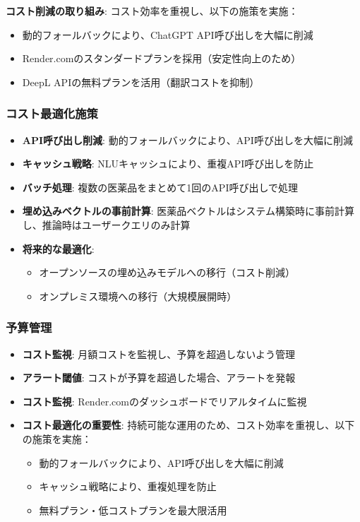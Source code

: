 \documentclass[a4paper,11pt,ja=standard,xelatex]{bxjsarticle}
\theoremstyle{definition}
\begin{document}
\textbf{コスト削減の取り組み}: コスト効率を重視し、以下の施策を実施：
\begin{itemize}
\item 動的フォールバックにより、ChatGPT API呼び出しを大幅に削減
\item Render.comのスタンダードプランを採用（安定性向上のため）
\item DeepL APIの無料プランを活用（翻訳コストを抑制）
\end{itemize}

\subsubsection{コスト最適化施策}

\begin{itemize}
\item \textbf{API呼び出し削減}: 動的フォールバックにより、API呼び出しを大幅に削減
\item \textbf{キャッシュ戦略}: NLUキャッシュにより、重複API呼び出しを防止
\item \textbf{バッチ処理}: 複数の医薬品をまとめて1回のAPI呼び出しで処理
\item \textbf{埋め込みベクトルの事前計算}: 医薬品ベクトルはシステム構築時に事前計算し、推論時はユーザークエリのみ計算
\item \textbf{将来的な最適化}: 
  \begin{itemize}
  \item オープンソースの埋め込みモデルへの移行（コスト削減）
  \item オンプレミス環境への移行（大規模展開時）
  \end{itemize}
\end{itemize}

\subsubsection{予算管理}

\begin{itemize}
\item \textbf{コスト監視}: 月額コストを監視し、予算を超過しないよう管理
\item \textbf{アラート閾値}: コストが予算を超過した場合、アラートを発報
\item \textbf{コスト監視}: Render.comのダッシュボードでリアルタイムに監視
\item \textbf{コスト最適化の重要性}: 持続可能な運用のため、コスト効率を重視し、以下の施策を実施：
  \begin{itemize}
  \item 動的フォールバックにより、API呼び出しを大幅に削減
  \item キャッシュ戦略により、重複処理を防止
  \item 無料プラン・低コストプランを最大限活用
  \end{itemize}
\end{itemize}
\end{document}
